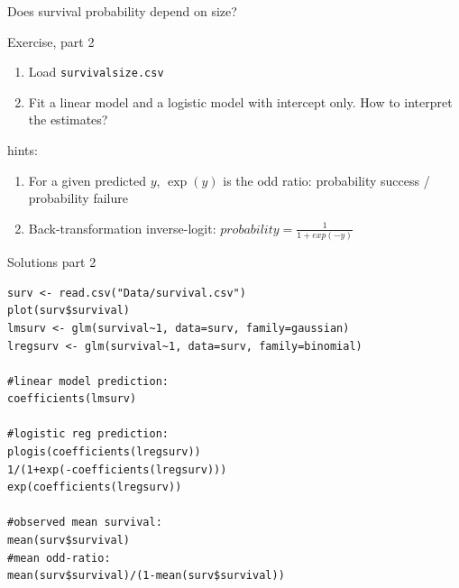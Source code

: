 \documentclass[10pt]{beamer}
\makeatletter
\newenvironment{kframe}{%
 \def\at@end@of@kframe{}%
 \ifinner\ifhmode%
  \def\at@end@of@kframe{\end{minipage}}%
  \begin{minipage}{\columnwidth}%
 \fi\fi%
 \def\FrameCommand##1{\hskip\@totalleftmargin \hskip-\fboxsep
 \colorbox{shadecolor}{##1}\hskip-\fboxsep
     \hskip-\linewidth \hskip-\@totalleftmargin \hskip\columnwidth}%
 \MakeFramed {\advance\hsize-\width
   \@totalleftmargin\z@ \linewidth\hsize
   \@setminipage}}%
 {\par\unskip\endMakeFramed%
 \at@end@of@kframe}
\newenvironment{knitrout}{}{} %
\makeatother
\begin{document}
\begin{frame}{Does survival probability depend on size?}
 
  \begin{exampleblock}{Exercise, part 2}
    \begin{enumerate}
      \item Load \texttt{survivalsize.csv}
      \item Fit a linear model and a logistic model with intercept only. How to interpret the estimates?
    \end{enumerate}
  \end{exampleblock}
  
  \pause
  
  \begin{block}{hints:}
  \begin{enumerate}
   \item For a given predicted $y$, $\exp(y)$ is the odd ratio: probability success / probability failure
   \item Back-transformation inverse-logit: $probability = \frac{1}{1 + exp(-y)}$
  \end{enumerate}
  \end{block}

  
\end{frame}

\begin{frame}[fragile]{Solutions part 2}
     
\begin{knitrout}
\color{fgcolor}\begin{kframe}
\small
\begin{verbatim}
surv <- read.csv("Data/survival.csv")
plot(surv$survival)
lmsurv <- glm(survival~1, data=surv, family=gaussian)
lregsurv <- glm(survival~1, data=surv, family=binomial)

#linear model prediction:
coefficients(lmsurv)

#logistic reg prediction:
plogis(coefficients(lregsurv))
1/(1+exp(-coefficients(lregsurv)))
exp(coefficients(lregsurv))

#observed mean survival:
mean(surv$survival)
#mean odd-ratio:
mean(surv$survival)/(1-mean(surv$survival))
\end{verbatim}
\end{kframe}
\end{knitrout}
\end{frame}
\end{document}
